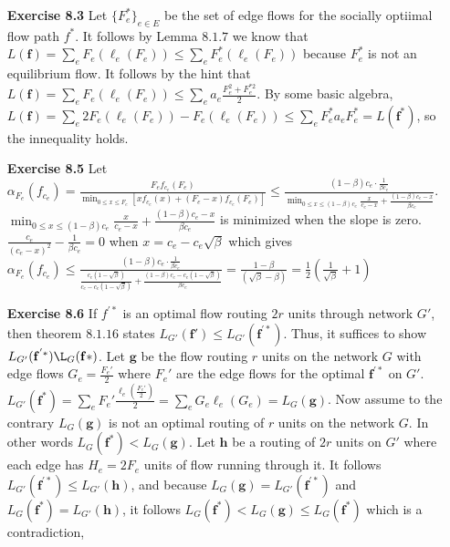 \documentclass[10pt]{article}[H]
\begin{document}
\begin{itemize}
    \item [\textbf{Exercise 8.3}] Let ${\{F_e^*\}}_{e\in E}$ be the set of edge flows for the socially optiimal flow path $f^*$. It follows by Lemma $8.1.7$ we know that $L(\mathbf{f})=\displaystyle\sum_{e}F_e(\ell_e(F_e))\le \sum_{e}F_e^*(\ell_e(F_e))$ because $F_e^*$ is not an equilibrium flow.
    It follows by the hint that $L(\mathbf{f})=\displaystyle\sum_{e}F_e(\ell_e(F_e))\le\sum_{e}a_e\frac{F_e^2+F_e^{*2}}{2}$.
    By some basic algebra, $L(\mathbf{f})=\sum_{e}2F_e(\ell_e(F_e))-F_e(\ell_e(F_e))\le \sum_{e}F_e^*a_e F^*_e=L(\mathbf{f^*})$, so the innequality holds.
    \item [\textbf{Exercise 8.5}] Let $\alpha_{F_e}(f_{c_e})=\frac{F_e f_{c_e}(F_e)}{\min_{0\le x \le F_e}[xf_{c_e}(x)+(F_e-x)f_{c_e}(F_e)]}\le \frac{(1-\beta)c_e\cdot\frac{1}{\beta c_e}}{\min_{0\le x \le (1-\beta)c_e}\frac{x}{c_e-x}+\frac{(1-\beta)c_e-x}{\beta c_e}}$.\\
     $\min_{0\le x \le (1-\beta)c_e}\frac{x}{c_e-x}+\frac{(1-\beta)c_e-x}{\beta c_e}$ is minimized when the slope is zero.\\ 
    $\frac{c_e}{{(c_e-x)}^2}-\frac{1}{\beta c_e}=0$ when $x=c_e-c_e\sqrt{\beta}$ which gives $\alpha_{F_e}(f_{c_e})\le \frac{(1-\beta)c_e\cdot\frac{1}{\beta c_e}}{\frac{c_e(1-\sqrt{\beta})}{c_e-c_e(1-\sqrt{\beta})}+\frac{(1-\beta)c_e-c_e(1-\sqrt{\beta})}{\beta c_e}}=\frac{1-\beta}{(\sqrt{\beta}-\beta)}=\frac{1}{2}(\frac{1}{\sqrt{\beta}}+1)$
    \item [\textbf{Exercise 8.6}] If $f^{'*}$ is an optimal flow routing $2r$ units through network $G'$, then theorem $8.1.16$ states $L_{G'}{(\mathbf{f'})}\le L_{G'}(\mathbf{f^{'*}})$. Thus, it suffices to show $L_{G'}(\mathbf{f^{'*}})\L_{G}(\mathbf{f*})$.
    Let $\mathbf{g}$ be the flow routing $r$ units on the network $G$ with edge flows $G_e=\frac{F_e'}{2}$ where $F_e'$ are the edge flows for the optimal $\mathbf{f^{'*}}$ on $G'$.
    $L_{G'}(\mathbf{f^*})=\displaystyle\sum_eF_e'\frac{\ell_e(\frac{F_e'}{2})}{2}=\sum_{e}G_e\ell_e(G_e)=L_G(\mathbf{g})$.
    Now assume to the contrary $L_G(\mathbf{g})$ is not an optimal routing of $r$ units on the network $G$. In other words $L_G(\mathbf{f^*})<L_G(\mathbf{g})$. 
    Let $\mathbf{h}$ be a routing of $2r$ units on $G'$ where each edge has $H_e=2F_e$ units of flow running through it. 
    It follows $L_{G'}(\mathbf{f^{'*}})\le L_{G'}(\mathbf{h})$, and because $L_G(\mathbf{g})=L_{G'}(\mathbf{f^{'*}})$ and $L_G(\mathbf{f^*})=L_{G'}(\mathbf{h})$, it follows $L_G(\mathbf{f^*})<L_G(\mathbf{g})\le L_G(\mathbf{f^*})$ which is a contradiction,
\end{itemize}
\end{document}
